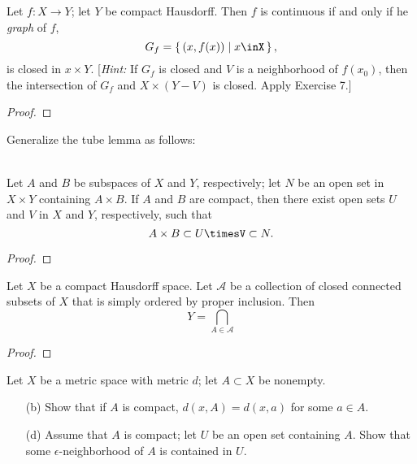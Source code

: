 \begin{problem}[Munkres \S26, Ex.\,8]
\begin{theorem*}
Let $f\colon X\to Y$; let $Y$ be compact Hausdorff. Then $f$ is
continuous if and only if he \emph{graph} of $f$,
\[
G_f=\left\{\,(x,f(x))\;\middle|\;x\inX\,\right\},
\]
is closed in $x\times Y$. [\emph{Hint:} If $G_f$ is closed and
$V$ is a neighborhood of $f(x_0)$, then the intersection of $G_f$
and $X\times(Y-V)$ is closed. Apply Exercise 7.]
\end{theorem*}
\end{problem}
\begin{proof}
\end{proof}
\newpage
\begin{problem}[Munkres \S26, Ex.\,9]
Generalize the tube lemma as follows:
\\\\
\begin{theorem*}
Let $A$ and $B$ be subspaces of $X$ and $Y$, respectively; let
$N$ be an open set in $X\times Y$ containing $A\times B$. If $A$
and $B$ are compact, then there exist open sets $U$ and $V$ in
$X$ and $Y$, respectively, such that
\[A\times B\subset U\timesV\subset N.\]
\end{theorem*}
\end{problem}
\begin{proof}
\end{proof}
\newpage
\begin{problem}[Munkres \S26, Ex.\,12]
\begin{theorem*}
Let $X$ be a compact Hausdorff space. Let $\mathcal{A}$ be a
collection of closed connected subsets of $X$ that is simply
ordered by proper inclusion. Then
\[Y=\bigcap_{A\in\mathcal{A}}\]
\end{theorem*}
\end{problem}
\begin{proof}
\end{proof}
\newpage
\begin{problem}[Munkres \S27, Ex.\,2(b,d)]
Let $X$ be a metric space with metric $d$; let $A\subset X$ be
nonempty.
\begin{itemize}
\item[(b)] Show that if $A$ is compact, $d(x,A)=d(x,a)$ for some
  $a\in A$.
\item[(d)] Assume that $A$ is compact; let $U$ be an open set
  containing $A$. Show that some $\epsilon$-neighborhood of $A$
  is contained in $U$.
\end{itemize}
\end{problem}
